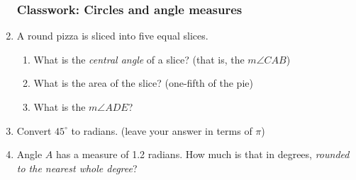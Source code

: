 \begin{enumerate}
\subsubsection*{Classwork: Circles and angle measures}
\item A round pizza is sliced into five equal slices.
 \begin{center}
 \end{center}
 \begin{enumerate}
   \item What is the \emph{central angle} of a slice? (that is, the $m\angle CAB$) \vspace{2cm}
   \item What is the area of the slice? (one-fifth of the pie) \vspace{3cm}
   \item What is the $m\angle ADE$? \vspace{3cm}
 \end{enumerate}

\item Convert $45^\circ$ to radians. (leave your answer in terms of $\pi$) \vspace{1.5cm}

\item Angle $A$ has a measure of 1.2 radians. How much is that in degrees, \emph{rounded to the nearest whole degree}?



\end{enumerate}
